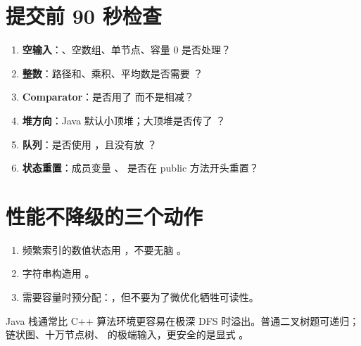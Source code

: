 \section{提交前 90 秒检查}

\begin{enumerate}
  \item \textbf{空输入}：、空数组、单节点、容量 0 是否处理？
  \item \textbf{整数}：路径和、乘积、平均数是否需要 ？
  \item \textbf{Comparator}：是否用了  而不是相减？
  \item \textbf{堆方向}：Java 默认小顶堆；大顶堆是否传了 ？
  \item \textbf{队列}：是否使用 ，且没有放 ？
  \item \textbf{状态重置}：成员变量 、 是否在 public 方法开头重置？
\end{enumerate}

\section{性能不降级的三个动作}

\begin{enumerate}
  \item 频繁索引的数值状态用 ，不要无脑 。
  \item 字符串构造用 。
  \item 需要容量时预分配：，但不要为了微优化牺牲可读性。
\end{enumerate}

\begin{pitfall}[递归深度]
Java 栈通常比 C++ 算法环境更容易在极深 DFS 时溢出。普通二叉树题可递归；链状图、十万节点树、 的极端输入，更安全的是显式 。
\end{pitfall}
